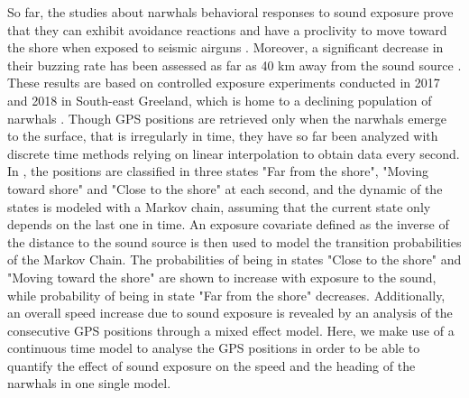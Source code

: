 \documentclass[11pt]{article}
\newcommand {\1}{\mathbb{1}}
\begin{document}
So far, the studies about narwhals behavioral responses to sound exposure prove that they can exhibit avoidance reactions and have a proclivity to move toward the shore when exposed to seismic airguns \cite{heide-jorgensen_behavioral_2021}. Moreover, a significant decrease in their buzzing rate has been assessed as far as 40 km away from the sound source \cite{tervo_narwhals_2021}. These results are based on controlled exposure experiments conducted in 2017 and 2018 in South-east Greeland, which is home to a declining population of narwhals \cite{garde_biological_2022}.  Though GPS positions are retrieved only when the narwhals emerge to the surface, that is irregularly in time, they have so far been analyzed with discrete time methods relying on linear interpolation to obtain data every second. In \cite{heide-jorgensen_behavioral_2021}, the positions are classified in three states "Far from the shore", "Moving toward shore" and "Close to the shore" at each second, and the dynamic of the states is modeled with a Markov chain, assuming that the current state only depends on the last one in time. An exposure covariate defined as the inverse of the distance to the sound source is then used to model the transition probabilities of the Markov Chain. The probabilities of being in states "Close to the shore" and "Moving toward the shore" are shown to increase with exposure to the sound, while probability of being in state "Far from the shore" decreases. Additionally, an overall speed increase due to sound exposure is revealed by an analysis of the consecutive GPS positions through a mixed effect model. 
Here, we  make use of a continuous time model to analyse the GPS positions in order to be able to quantify the effect of sound exposure on the speed and the heading of the narwhals in one single model. \\
\end{document}
